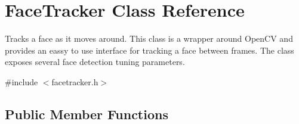 \hypertarget{class_face_tracker}{\section{Face\-Tracker Class Reference}
\label{class_face_tracker}
}


Tracks a face as it moves around. This class is a wrapper around Open\-C\-V and provides an eassy to use interface for tracking a face between frames. The class exposes several face detection tuning parameters.  




{\ttfamily \#include $<$facetracker.\-h$>$}

\subsection*{Public Member Functions}

